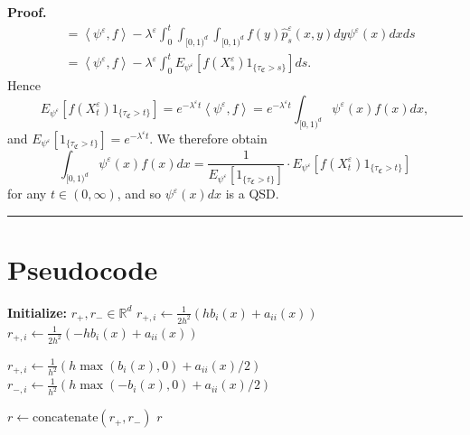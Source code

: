 \documentclass[english,11pt]{article}%
\newcommand{\R}{\mathbb{R}}
\numberwithin{equation}{section}
\numberwithin{example}{section}
\numberwithin{theorem}{section}
\newenvironment{proof}[1][Proof]{\noindent\textbf{#1.} }{\ \rule{0.5em}{0.5em}}
\begin{document}
\begin{proof}
\begin{align*}
&  =\left\langle \psi^{\varepsilon},f\right\rangle -\lambda^{\varepsilon}%
\int_{0}^{t}\int_{[0,1)^{d}}\int_{[0,1)^{d}}f(y)\hat{p}_{s}^{\varepsilon
}(x,y)dy\psi^{\varepsilon}(x)dxds\\
&  =\left\langle \psi^{\varepsilon},f\right\rangle -\lambda^{\varepsilon}%
\int_{0}^{t}E_{\psi^{\varepsilon}}\left[  f(X_{s}^{\varepsilon})1_{\{\tau
_{\mathfrak{C}}>s\}}\right]ds  .
\end{align*}
Hence
\[
E_{\psi^{\varepsilon}}\left[  f(X_{t}^{\varepsilon})1_{\{\tau_{\mathfrak{C}%
}>t\}}\right]  =e^{-\lambda^{\varepsilon}t}\left\langle \psi^{\varepsilon
},f\right\rangle =e^{-\lambda^{\varepsilon}t}\int_{[0,1)^{d}}\psi
^{\varepsilon}(x)f(x)dx,
\]
and $E_{\psi^{\varepsilon}}\left[  1_{\{\tau_{\mathfrak{C}}>t\}}\right]
=e^{-\lambda^{\varepsilon}t}$. We therefore obtain
\[
\int_{\lbrack0,1)^{d}}\psi^{\varepsilon}(x)f(x)dx=\frac{1}{E_{\psi
^{\varepsilon}}\left[  1_{\{\tau_{\mathfrak{C}}>t\}}\right]  }\cdot
E_{\psi^{\varepsilon}}\left[  f(X_{t}^{\varepsilon})1_{\{\tau_{\mathfrak{C}%
}>t\}}\right]
\]
for any $t\in(0,\infty)$, and so $\psi^{\varepsilon}(x)dx$ is a QSD.
\end{proof}



\section{Pseudocode}
\label{sec:app:pseudocode}

\begin{algorithm}
\caption{Compute SDE Transition Rates}
\begin{algorithmic}[1]
\State \textbf{Initialize:} $r_+, r_- \in \R^d$
    \State $r_{+, i} \gets \frac{1}{2h^2}(h  b_i(x) + a_{ii}(x))$
    \State $r_{+, i} \gets \frac{1}{2h^2}(-h  b_i(x) + a_{ii}(x))$
\EndFor

        \State $r_{+, i} \gets \frac{1}{h^2}(h  \max(b_i(x), 0) + a_{ii}(x)/2)$
        \State $r_{-, i} \gets \frac{1}{h^2}(h  \max(-b_i(x), 0) + a_{ii}(x)/2)$
    \EndFor
\EndIf

\State $r \gets \text{concatenate}(r_+, r_-)$
\State \Return $r$
\EndFunction
\end{algorithmic}
\label{alg:sdetransrate}
\end{algorithm}
\end{document}
